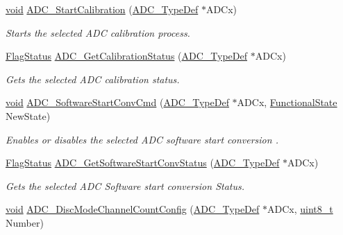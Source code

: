 \begin{DoxyCompactItemize}
\hyperlink{usb__devapi_8h_afabf60e7f57651d6d595a02c75f07cd0}{void} \hyperlink{group___a_d_c___private___functions_gadcba6341124a6aabfd2dd885ca8e5f14}{A\+D\+C\+\_\+\+Start\+Calibration} (\hyperlink{struct_a_d_c___type_def}{A\+D\+C\+\_\+\+Type\+Def} $\ast$A\+D\+Cx)
\begin{DoxyCompactList}\small\item\em Starts the selected A\+DC calibration process. \end{DoxyCompactList}\item 
\hyperlink{agilefox_2library_2inc_2stm32f10x__type_8h_a89136caac2e14c55151f527ac02daaff}{Flag\+Status} \hyperlink{group___a_d_c___private___functions_ga7a728f699b487c7fa1694d7424967122}{A\+D\+C\+\_\+\+Get\+Calibration\+Status} (\hyperlink{struct_a_d_c___type_def}{A\+D\+C\+\_\+\+Type\+Def} $\ast$A\+D\+Cx)
\begin{DoxyCompactList}\small\item\em Gets the selected A\+DC calibration status. \end{DoxyCompactList}\item 
\hyperlink{usb__devapi_8h_afabf60e7f57651d6d595a02c75f07cd0}{void} \hyperlink{group___a_d_c___private___functions_ga694130a8d1ad3c8877b7eddb29611b30}{A\+D\+C\+\_\+\+Software\+Start\+Conv\+Cmd} (\hyperlink{struct_a_d_c___type_def}{A\+D\+C\+\_\+\+Type\+Def} $\ast$A\+D\+Cx, \hyperlink{agilefox_2library_2inc_2stm32f10x__type_8h_ac9a7e9a35d2513ec15c3b537aaa4fba1}{Functional\+State} New\+State)
\begin{DoxyCompactList}\small\item\em Enables or disables the selected A\+DC software start conversion . \end{DoxyCompactList}\item 
\hyperlink{agilefox_2library_2inc_2stm32f10x__type_8h_a89136caac2e14c55151f527ac02daaff}{Flag\+Status} \hyperlink{group___a_d_c___private___functions_gaf1119583782ecbcec380efcb7eb74883}{A\+D\+C\+\_\+\+Get\+Software\+Start\+Conv\+Status} (\hyperlink{struct_a_d_c___type_def}{A\+D\+C\+\_\+\+Type\+Def} $\ast$A\+D\+Cx)
\begin{DoxyCompactList}\small\item\em Gets the selected A\+DC Software start conversion Status. \end{DoxyCompactList}\item 
\hyperlink{usb__devapi_8h_afabf60e7f57651d6d595a02c75f07cd0}{void} \hyperlink{group___a_d_c___private___functions_ga6eb241ba82d67d1371136c9132083937}{A\+D\+C\+\_\+\+Disc\+Mode\+Channel\+Count\+Config} (\hyperlink{struct_a_d_c___type_def}{A\+D\+C\+\_\+\+Type\+Def} $\ast$A\+D\+Cx, \hyperlink{_p_e___types_8h_aba7bc1797add20fe3efdf37ced1182c5}{uint8\+\_\+t} Number)

\end{DoxyCompactItemize}

